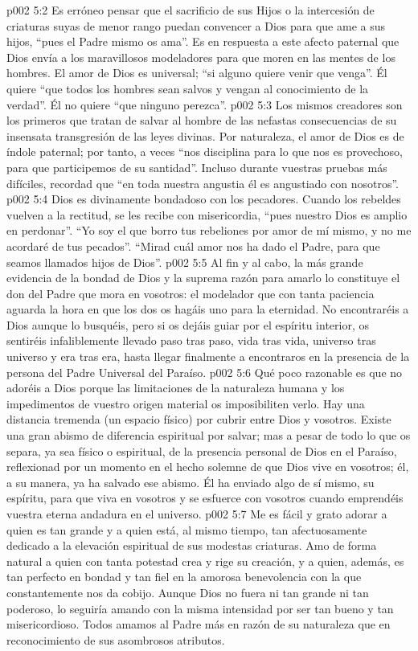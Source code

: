 \vs p002 5:2 \pc Es erróneo pensar que el sacrificio de sus Hijos o la intercesión de criaturas suyas de menor rango puedan convencer a Dios para que ame a sus hijos, “pues el Padre mismo os ama”. Es en respuesta a este afecto paternal que Dios envía a los maravillosos modeladores para que moren en las mentes de los hombres. El amor de Dios es universal; “si alguno quiere venir que venga”. Él quiere “que todos los hombres sean salvos y vengan al conocimiento de la verdad”. Él no quiere “que ninguno perezca”.
\vs p002 5:3 Los mismos creadores son los primeros que tratan de salvar al hombre de las nefastas consecuencias de su insensata transgresión de las leyes divinas. Por naturaleza, el amor de Dios es de índole paternal; por tanto, a veces “nos disciplina para lo que nos es provechoso, para que participemos de su santidad”. Incluso durante vuestras pruebas más difíciles, recordad que “en toda nuestra angustia él es angustiado con nosotros”.
\vs p002 5:4 Dios es divinamente bondadoso con los pecadores. Cuando los rebeldes vuelven a la rectitud, se les recibe con misericordia, “pues nuestro Dios es amplio en perdonar”. “Yo soy el que borro tus rebeliones por amor de mí mismo, y no me acordaré de tus pecados”. “Mirad cuál amor nos ha dado el Padre, para que seamos llamados hijos de Dios”.
\vs p002 5:5 Al fin y al cabo, la más grande evidencia de la bondad de Dios y la suprema razón para amarlo lo constituye el don del Padre que mora en vosotros: el modelador que con tanta paciencia aguarda la hora en que los dos os hagáis uno para la eternidad. No encontraréis a Dios aunque lo busquéis, pero si os dejáis guiar por el espíritu interior, os sentiréis infaliblemente llevado paso tras paso, vida tras vida, universo tras universo y era tras era, hasta llegar finalmente a encontraros en la presencia de la persona del Padre Universal del Paraíso.
\vs p002 5:6 \pc Qué poco razonable es que no adoréis a Dios porque las limitaciones de la naturaleza humana y los impedimentos de vuestro origen material os imposibiliten verlo. Hay una distancia tremenda (un espacio físico) por cubrir entre Dios y vosotros. Existe una gran abismo de diferencia espiritual por salvar; mas a pesar de todo lo que os separa, ya sea físico o espiritual, de la presencia personal de Dios en el Paraíso, reflexionad por un momento en el hecho solemne de que Dios vive en vosotros; él, a su manera, ya ha salvado ese abismo. Él ha enviado algo de sí mismo, su espíritu, para que viva en vosotros y se esfuerce con vosotros cuando emprendéis vuestra eterna andadura en el universo.
\vs p002 5:7 Me es fácil y grato adorar a quien es tan grande y a quien está, al mismo tiempo, tan afectuosamente dedicado a la elevación espiritual de sus modestas criaturas. Amo de forma natural a quien con tanta potestad crea y rige su creación, y a quien, además, es tan perfecto en bondad y tan fiel en la amorosa benevolencia con la que constantemente nos da cobijo. Aunque Dios no fuera ni tan grande ni tan poderoso, lo seguiría amando con la misma intensidad por ser tan bueno y tan misericordioso. Todos amamos al Padre más en razón de su naturaleza que en reconocimiento de sus asombrosos atributos.
